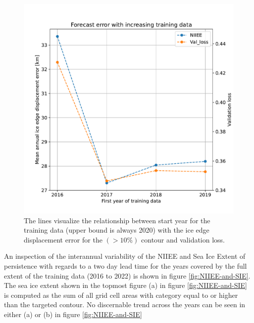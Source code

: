 \documentclass[../main/thesis]{subfiles}
\begin{document}
\begin{figure}
    \centering
    \includegraphics[width=.9\textwidth]{years_start.pdf}
    \caption{\label{fig:append_years}The lines visualize the relationship between start year for the training data (upper bound is always 2020) with the ice edge displacement error for the $(> 10\%)$ contour and validation loss.}
\end{figure}

An inspection of the interannual variability of the NIIEE and Sea Ice Extent of persistence with regards to a two day lead time for the years covered by the full extent of the training data (2016 to 2022) is shown in figure \ref{fig:NIIEE-and-SIE}. The sea ice extent shown in the topmost figure (a) in figure \ref{fig:NIIEE-and-SIE} is computed as the sum of all grid cell areas with category equal to or higher than the targeted contour. No discernable trend across the years can be seen in either (a) or (b) in figure \ref{fig:NIIEE-and-SIE} 
\end{document}
